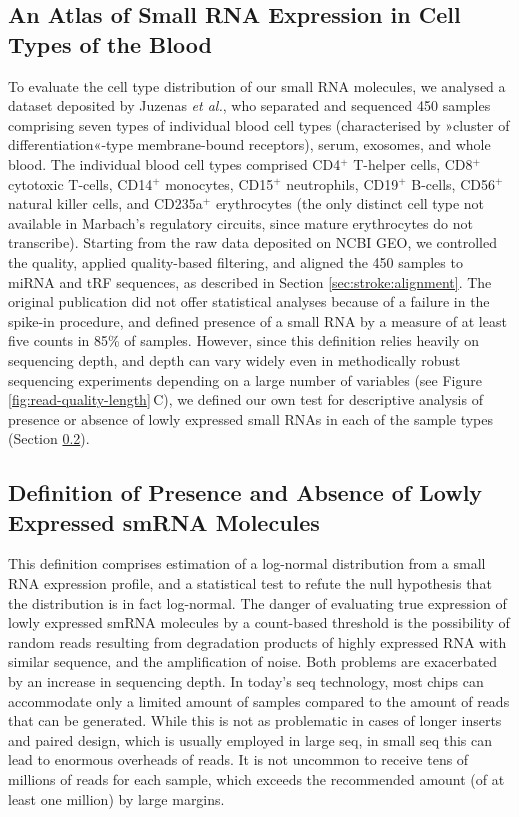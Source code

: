\begin{method}
\subsection{An Atlas of Small RNA Expression in Cell Types of the Blood} \label{sec:stroke:juzenas}
To evaluate the cell type distribution of our small RNA molecules, we analysed a dataset deposited by Juzenas \emph{et al.},\cite{Juzenas2017} who separated and sequenced 450 samples comprising seven types of individual blood cell types (characterised by »cluster of differentiation«-type membrane-bound receptors), serum, exosomes, and whole blood. The individual blood cell types comprised CD4$^+$ T-helper cells, CD8$^+$ cytotoxic T-cells, CD14$^+$ monocytes, CD15$^+$ neutrophils, CD19$^+$ B-cells, CD56$^+$ natural killer cells, and CD235a$^+$ erythrocytes (the only distinct cell type not available in Marbach's regulatory circuits, since mature erythrocytes do not transcribe). Starting from the raw data deposited on NCBI GEO, we controlled the quality, applied quality-based filtering, and aligned the 450 samples to miRNA and tRF sequences, as described in Section \ref{sec:stroke:alignment}. The original publication did not offer statistical analyses because of a failure in the spike-in procedure, and defined presence of a small RNA by a measure of at least five counts in 85\% of samples. However, since this definition relies heavily on sequencing depth, and depth can vary widely even in methodically robust sequencing experiments depending on a large number of variables (see Figure \ref{fig:read-quality-length}\,C), we defined our own test for descriptive analysis of presence or absence of lowly expressed small RNAs in each of the sample types (Section \ref{sec:stroke:presence}).

\subsection[Definition of Presence and Absence of Lowly Expressed\texorpdfstring{\\}{} smRNA Molecules]{Definition of Presence and Absence of Lowly Expressed smRNA Molecules} \label{sec:stroke:presence}
This definition comprises estimation of a log-normal distribution from a small RNA expression profile, and a statistical test to refute the null hypothesis that the distribution is in fact log-normal. The danger of evaluating true expression of lowly expressed smRNA molecules by a count-based threshold is the possibility of random reads resulting from degradation products of highly expressed RNA with similar sequence, and the amplification of noise. Both problems are exacerbated by an increase in sequencing depth. In today's \ac{seq} technology, most chips can accommodate only a limited amount of samples compared to the amount of reads that can be generated. While this is not as problematic in cases of longer inserts and paired design, which is usually employed in large \ac{seq}, in small \ac{seq} this can lead to enormous overheads of reads. It is not uncommon to receive tens of millions of reads for each sample, which exceeds the recommended amount (of at least one million) by large margins.


\end{method}
